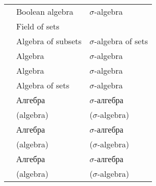 \begin{remark}
\begin{table}[!ht]
\begin{tabular}{l l l}
      \cite[def. 1.4.1; def. 1.4.12]{Tao2011MeasureTheory}              & Boolean algebra                                       & \( \sigma \)-algebra                             \\
      \cite[113; 118]{Grätzer2011LatticeTheory}                         & Field of sets                                         &                                                  \\
      \cite[294; 49]{WheedenZygmund2015MeasureAndIntegral}              & Algebra of subsets                                    & \( \sigma \)-algebra of sets                     \\
      \cite[1; 2]{Cohn2013MeasureTheory}                                & Algebra                                               & \( \sigma \)-algebra                             \\
      \cite[2]{Çinlar2011ProbabilityAndStochastics}                     & Algebra                                               & \( \sigma \)-algebra                             \\
      \cite[3; 4]{Bobrowski2005FunctionalAnalysis}                      & Algebra of sets                                       & \( \sigma \)-algebra                             \\
      \cite[34; 36]{Вулих1973ВещественныйАнализ}                        & Алгебра                                               & \( \sigma \)-алгебра                             \\
                                                                        & \footnotesize (algebra)                               & \footnotesize (\( \sigma \)-algebra)             \\
      \cite[50]{КанторовичАкилов1984ФункциональныйАнализ}               & Алгебра                                               & \( \sigma \)-алгебра                             \\
                                                                        & \footnotesize (algebra)                               & \footnotesize (\( \sigma \)-algebra)             \\
      \cite[def. 1.2]{ДьяченкоУльянов1998МераИИнтеграл}                 & Алгебра                                               & \( \sigma \)-алгебра                             \\
                                                                        & \footnotesize (algebra)                               & \footnotesize (\( \sigma \)-algebra)             \\

\end{tabular}
\end{table}
\end{remark}
